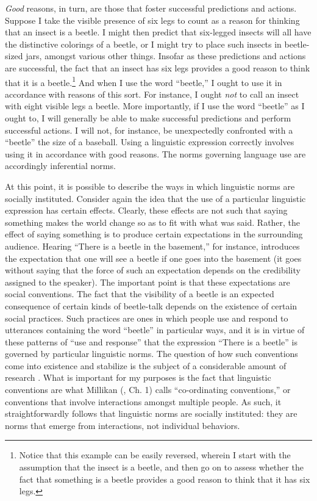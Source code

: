 \textit{Good} reasons, in turn, are those that foster successful predictions and actions. Suppose I take the visible presence of six legs to count as a reason for thinking that an insect is a beetle. I might then predict that six-legged insects will all have the distinctive colorings of a beetle, or I might try to place such insects in beetle-sized jars, amongst various other things. Insofar as these predictions and actions are successful, the fact that an insect has six legs provides a good reason to think that it is a beetle.\footnote{Notice that this example can be easily reversed, wherein I start with the assumption that the insect is a beetle, and then go on to assess whether the fact that something is a beetle provides a good reason to think that it has six legs.} And when I use the word ``beetle,'' I ought to use it in accordance with reasons of this sort. For instance, I ought \textit{not} to call an insect with eight visible legs a beetle. More importantly, if I use the word ``beetle'' as I ought to, I will generally be able to make successful predictions and perform successful actions. I will not, for instance, be unexpectedly confronted with a ``beetle'' the size of a baseball. Using a linguistic expression correctly involves using it in accordance with good reasons. The norms governing language use are accordingly inferential norms. 

At this point, it is possible to describe the ways in which linguistic norms are socially instituted. Consider again the idea that the use of a particular linguistic expression has certain effects. Clearly, these effects are not such that saying something makes the world change so as to fit with what was said. Rather, the effect of saying something is to produce certain expectations in the surrounding audience. Hearing ``There is a beetle in the basement,'' for instance, introduces the expectation that one will see a beetle if one goes into the basement (it goes without saying that the force of such an expectation depends on the credibility assigned to the speaker). The important point is that these expectations are social conventions. The fact that the visibility of a beetle is an expected consequence of certain kinds of beetle-talk depends on the existence of certain social practices. Such practices are ones in which people use and respond to utterances containing the word ``beetle'' in particular ways, and it is in virtue of these patterns of ``use and response'' \citep[][p. 50]{Millikan:2005} that the expression ``There is a beetle'' is governed by particular linguistic norms. The question of how such conventions come into existence and stabilize is the subject of a considerable amount of research \citep[see, e.g.,][]{Millikan:2005}. What is important for my purposes is the fact that linguistic conventions are what Millikan (\citeyear{Millikan:2005}, Ch. 1) calls ``co-ordinating conventions,'' or conventions that involve interactions amongst multiple people. As such, it straightforwardly follows that linguistic norms are socially instituted: they are norms that emerge from interactions, not individual behaviors.


